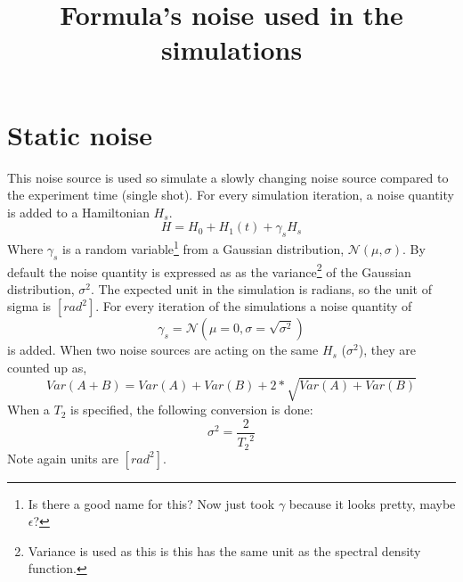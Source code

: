 \documentclass{paper}
\title{Formula's noise used in the simulations}
\begin{document}
\section{Static noise} %
\label{sec:static_noise}
This noise source is used so simulate a slowly changing noise source compared to the experiment time (single shot). For every simulation iteration, a noise quantity is added to a Hamiltonian $H_s$.
\begin{equation}
	H = H_0 + H_1(t) + \gamma_s H_s
\end{equation}
Where $\gamma_s$ is a random variable\footnote{\color{blue}Is there a good name for this? Now just took $\gamma$ because it looks pretty, maybe $\epsilon$?} from a Gaussian distribution, $\mathcal{N}(\mu, \sigma)$. By default the noise quantity is expressed as as the variance\footnote{Variance is used as this is this has the same unit as the spectral density function.} of the Gaussian distribution, $\sigma^2$. The expected unit in the simulation is radians, so the unit of sigma is $[rad^2]$. For every iteration of the simulations a noise quantity of 
\begin{equation}
	\gamma_s = \mathcal{N}(\mu = 0,\sigma=\sqrt{\sigma^2})
\end{equation}
is added. When two noise sources are acting on the same $H_s$ ($\sigma^2$), they are counted up as,
\begin{equation}
	Var(A + B) = Var(A) + Var(B) + 2*\sqrt{Var(A) + Var(B)}
\end{equation}
When a $T_2$ is specified, the following conversion is done:
\begin{equation}
	\sigma^2 = \frac{2}{{T_2}^2}
\end{equation}
Note again units are $[rad^2]$.
\end{document}
